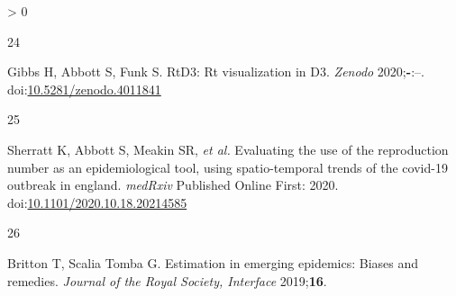 \documentclass[
]{article}
\newlength{\cslhangindent}
\newlength{\csllabelwidth}
\newenvironment{CSLReferences}[2] %
 {%
  \setlength{\parindent}{0pt}
  \ifodd #1 \everypar{\setlength{\hangindent}{\cslhangindent}}\ignorespaces\fi
  \ifnum #2 > 0
  \setlength{\parskip}{#2\baselineskip}
  \fi
 }%
 {}
\newcommand{\CSLLeftMargin}[1]{\parbox[t]{\csllabelwidth}{#1}}
\newcommand{\CSLRightInline}[1]{\parbox[t]{\linewidth - \csllabelwidth}{#1}\break}
\begin{document}
\begin{CSLReferences}{0}{0}
\leavevmode\hypertarget{ref-rtd3}{}%
\CSLLeftMargin{24 }
\CSLRightInline{Gibbs H, Abbott S, Funk S. RtD3: Rt visualization in D3.
\emph{Zenodo} 2020;\textbf{-}:--.
doi:\href{https://doi.org/10.5281/zenodo.4011841}{10.5281/zenodo.4011841}}

\leavevmode\hypertarget{ref-rt-comparison}{}%
\CSLLeftMargin{25 }
\CSLRightInline{Sherratt K, Abbott S, Meakin SR, \emph{et al.}
Evaluating the use of the reproduction number as an epidemiological
tool, using spatio-temporal trends of the covid-19 outbreak in england.
\emph{medRxiv} Published Online First: 2020.
doi:\href{https://doi.org/10.1101/2020.10.18.20214585}{10.1101/2020.10.18.20214585}}

\leavevmode\hypertarget{ref-Britton:2019gf}{}%
\CSLLeftMargin{26 }
\CSLRightInline{Britton T, Scalia Tomba G. Estimation in emerging
epidemics: Biases and remedies. \emph{Journal of the Royal Society,
Interface} 2019;\textbf{16}.}

\end{CSLReferences}
\end{document}
